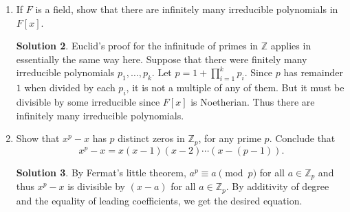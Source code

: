 \documentclass{article}
\newcommand{\ZZ}{\mathbb{Z}}
\theoremstyle{definition}
\newtheorem*{solution}{Solution}
\begin{document}
\begin{enumerate}
\begin{solution}
\end{solution}
\item[17.21.] If $F$ is a field, show that there are infinitely many irreducible polynomials in $F[x]$.
\begin{solution}
Euclid's proof for the infinitude of primes in $\ZZ$ applies in essentially the same way here.  Suppose that there were finitely many irreducible polynomials $p_1, \dots, p_k$.  Let $p = 1 + \prod_{i=1}^k p_i$.  Since $p$ has remainder $1$ when divided by each $p_i$, it is not a multiple of any of them.  But it must be divisible by some irreducible since $F[x]$ is Noetherian.  Thus there are infinitely many irreducible polynomials.
\end{solution}
\item[17.24.] Show that $x^p - x$ has $p$ distinct zeros in $\ZZ_p$, for any prime $p$.  Conclude that
\[
x^p - x = x(x-1)(x-2) \cdots (x - (p-1)).
\]
\begin{solution}
By Fermat's little theorem, $a^p \equiv a \pmod{p}$ for all $a \in \ZZ_p$ and thus $x^p - x$ is divisible by $(x-a)$ for all $a \in \ZZ_p$.  By additivity of degree and the equality of leading coefficients, we get the desired equation.
\end{solution}
\end{enumerate}
\end{document}
